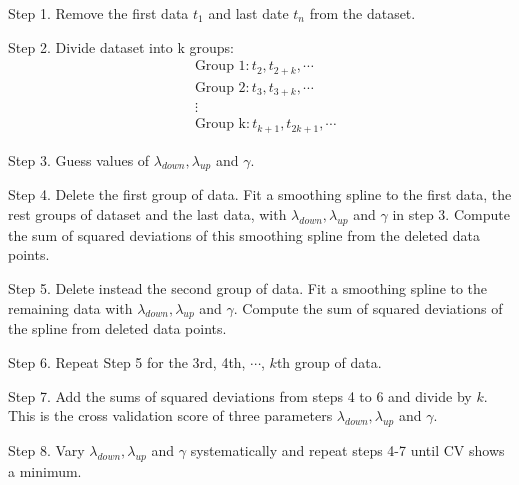 Step 1. Remove the first data $t_1$ and last date $t_n$ from the dataset.

Step 2. Divide dataset into k groups:
\begin{align*}
& \mbox{Group 1}: t_2, t_{2+k}, \cdots \\
& \mbox{Group 2}: t_3, t_{3+k}, \cdots \\
& \vdots \\
& \mbox{Group k}: t_{k+1}, t_{2k+1}, \cdots
\end{align*}

Step 3. Guess values of $\lambda_{down}, \lambda_{up}$ and $\gamma$.

Step 4. Delete the first group of data. Fit a smoothing spline to the first data, the rest groups of dataset and the last data, with  $\lambda_{down}, \lambda_{up}$ and $\gamma$ in step 3. Compute the sum of squared deviations of this smoothing spline from the deleted data points.

Step 5. Delete instead the second group of data. Fit a smoothing spline to the remaining data with  $\lambda_{down}, \lambda_{up}$ and $\gamma$. Compute the sum of squared deviations of the spline from deleted data points.

Step 6. Repeat Step 5 for the 3rd, 4th, $\cdots$, $k$th group of data.

Step 7. Add the sums of squared deviations from steps 4 to 6 and divide by $k$. This is the cross validation score of three parameters  $\lambda_{down}, \lambda_{up}$ and $\gamma$.

Step 8. Vary  $\lambda_{down}, \lambda_{up}$ and $\gamma$ systematically and repeat steps 4-7 until CV shows a minimum.

